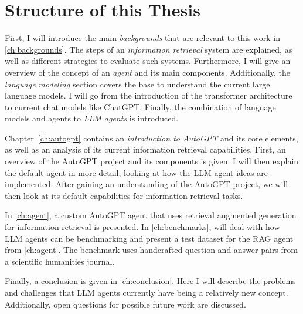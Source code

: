 \documentclass[../main.tex]{subfiles}
\begin{document}
\section{Structure of this Thesis}

First, I will introduce the main \emph{backgrounds}
that are relevant to this work in \autoref{ch:backgrounds}.
The steps of an \emph{information retrieval} system are explained, as well
as different strategies to evaluate such systems.
Furthermore, I will give an overview of the concept of an \emph{agent} and its main components.
Additionally, the \emph{language modeling} section covers the base
to understand the current large language models.
I will go from the introduction of the transformer architecture to current chat models like ChatGPT.
Finally, the combination of language models and agents to \emph{LLM agents} is introduced.

Chapter~\ref{ch:autogpt} contains an \emph{introduction to AutoGPT} and its core elements,
as well as an analysis of its current information retrieval capabilities.
First, an overview of the AutoGPT project and its components is given.
I will then explain the default agent in more detail,
looking at how the LLM agent ideas are implemented.
After gaining an understanding of the AutoGPT project,
we will then look at its default capabilities for information retrieval tasks.

In \autoref{ch:agent},
a custom AutoGPT agent that uses retrieval augmented generation for information retrieval is presented.
In \autoref{ch:benchmarks}, will deal with how LLM agents can be benchmarking
and present a test dataset for the RAG agent from \autoref{ch:agent}.
The benchmark uses handcrafted question-and-answer pairs from a scientific humanities journal.

Finally, a conclusion is given in \autoref{ch:conclusion}.
Here I will describe the problems and challenges
that LLM agents currently have being a relatively new concept.
Additionally, open questions for possible future work are discussed.
\end{document}

